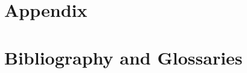 \documentclass[ twoside,openright,titlepage,numbers=noenddot,headinclude,%
                footinclude=true,cleardoublepage=empty,abstractoff, %
                BCOR=5mm,paper=a4,fontsize=11pt,%
                ngerman,american,%
                ]{scrreprt}
\begin{document}
\appendix
\cleardoublepage
\part{Appendix}





\part{Bibliography and Glossaries}
\cleardoublepage
%
\cleardoublepage
\cleardoublepage
\end{document}
